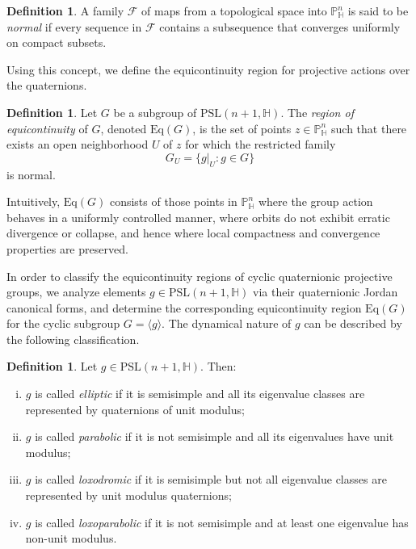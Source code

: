 \documentclass[12pt,reqno]{amsart}
\numberwithin{equation}{section}
\theoremstyle{definition}
\newtheorem{definition}[theorem]{Definition}
\begin{document}
\begin{definition}
A family $\mathcal{F}$ of maps from a topological space into $\mathbb{P}^n_\mathbb{H}$ is said to be \emph{normal} if every sequence in $\mathcal{F}$ contains a subsequence that converges uniformly on compact subsets.
\end{definition}

Using this concept, we define the equicontinuity region for projective actions over the quaternions.

\begin{definition}
\label{eqcnt}
Let $G$ be a subgroup of $\mathrm{PSL}(n+1, \mathbb{H})$. The \emph{region of equicontinuity} of $G$, denoted $\mathrm{Eq}(G)$, is the set of points $z \in \mathbb{P}^n_\mathbb{H}$ such that there exists an open neighborhood $U$ of $z$ for which the restricted family
\[
G_U = \{ g|_U : g \in G \}
\]
is normal. 

\medskip Intuitively, $\mathrm{Eq}(G)$ consists of those points in $\mathbb{P}^n_\mathbb{H}$ where the group action behaves in a uniformly controlled manner, where orbits do not exhibit erratic divergence or collapse, and hence where local compactness and convergence properties are preserved.
\end{definition}

In order to classify the equicontinuity regions of cyclic quaternionic projective groups, we analyze elements $g \in \mathrm{PSL}(n+1, \mathbb{H})$ via their quaternionic Jordan canonical forms, and determine the corresponding equicontinuity region $\mathrm{Eq}(G)$ for the cyclic subgroup $G = \langle g \rangle$. The dynamical nature of $g$ can be described by the following classification.
\begin{definition}
\label{def:classification}
\label{trichotomy}
Let $g \in \mathrm{PSL}(n+1, \mathbb{H})$. Then:
\begin{enumerate}[(i)]
    \item $g$ is called \emph{elliptic} if it is semisimple and all its eigenvalue classes are represented by quaternions of unit modulus;
    \item $g$ is called \emph{parabolic} if it is not semisimple and all its eigenvalues have unit modulus;
     \item $g$ is called \emph{loxodromic} if it is semisimple but not all eigenvalue classes are represented by unit modulus quaternions;
    \item $g$ is called \emph{loxoparabolic} if it is not semisimple and at least one eigenvalue has non-unit modulus.
\end{enumerate}
\end{definition}
\end{document}
